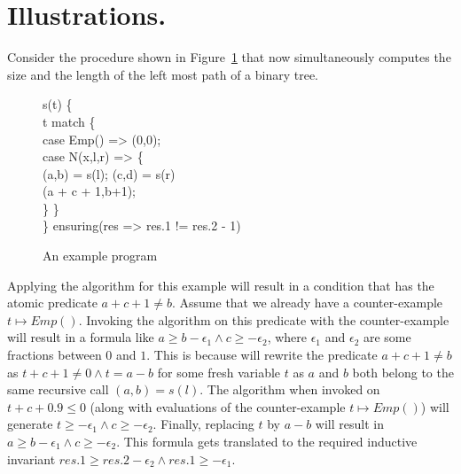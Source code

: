 \section{Illustrations.}

Consider the procedure shown in Figure~\ref{fig:eg2} that now simultaneously computes the size and the 
length of the left most path of a binary tree.
%
\begin{figure}
\begin{myprogram}
s(t) \{ \\
\pnl \> t match \{ \\
\pnl \> case Emp() => (0,0); \\
\pnl \> case N(x,l,r) => \{ \\
\pnl \> \> (a,b) = s(l); (c,d) = s(r) \\
\pnl \> \> (a + c + 1,b+1); \\
	 \> \> \}
\> \} \\
\} ensuring(res => res.1 != res.2 - 1)
\end{myprogram}
\caption{An example program} \label{fig:eg2}
\end{figure}
%
Applying the \IndGen algorithm for this example will result  in a condition that has the atomic predicate 
$a+c+1 \ne b$. Assume that we already have a counter-example $t \mapsto Emp()$. 
Invoking the \SG algorithm on this predicate with the counter-example will result in a formula
like $a \ge b - \epsilon_1 \wedge c \ge -\epsilon_2$, where $\epsilon_1$ and $\epsilon_2$ are some 
fractions between $0$ and $1$.
This is because \SG will rewrite the predicate $a+c+1 \ne b$ as $t + c + 1 \ne 0 \wedge t = a - b$  for
some fresh variable $t$ as $a$ and $b$ both belong to the same recursive call $(a,b) = s(l)$.
The \hypervol algorithm when invoked on $t + c + 0.9 \le 0$ (along with evaluations of the counter-example
$t \mapsto Emp()$) will generate $t \ge -\epsilon_1 \wedge c \ge -\epsilon_2$. 
Finally, replacing $t$ by $a -b$ will result in $a \ge b - \epsilon_1 \wedge c \ge -\epsilon_2$.
This formula gets translated to the required inductive invariant 
$res.1 \ge res.2 - \epsilon_2 \wedge res.1 \ge -\epsilon_1$.
 
